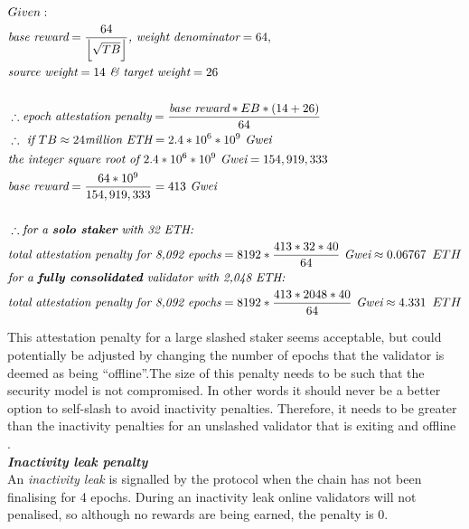 \begin{equation*}
\begin{split}
& Given:\\
& \textit{base reward} = \frac{64}{ \left\lfloor \sqrt{TB} \right\rfloor} \textit{, weight denominator} = 64, \\
& \textit{source weight} = 14 \textit{  \& target weight} = 26\\
& \\
& \therefore \textit{epoch attestation penalty} = \frac{\textit{base reward} * EB * (14 + 26)}{64} \\
& \therefore \textit{ if } TB \approx 24 \textit{million ETH} = 2.4 * 10^6 * 10^9 \textit{ Gwei}\\
& \textit{the integer square root of } 2.4 * 10^6 * 10^9 \textit{ Gwei} = 154,919,333 \\
& \textit{base reward} = \frac{64 * 10^9}{154,919,333} = 413 \textit{ Gwei} \\
& \\
& \therefore \textit{for a \textbf{solo staker} with 32 ETH:} \\
& \textit{total attestation penalty for 8,092 epochs} = 8192 * \frac{413*32*40}{64}  \textit{ Gwei}  \approx 0.06767 \texttt{ } ETH \\
& \textit{for a \textbf{fully consolidated} validator with 2,048 ETH:} \\
& \textit{total attestation penalty for 8,092 epochs} = 8192 * \frac{413*2048*40}{64}  \textit{ Gwei}\approx 4.331 \texttt{ } ETH \\
\end{split}
\end{equation*}

This attestation penalty for a large slashed staker seems acceptable, but could potentially be adjusted by changing the number of epochs that the validator is deemed as being ``offline''.The size of this penalty needs to be such that the security model is not compromised. In other words it should never be a better option to self-slash to avoid inactivity penalties. Therefore, it needs to be greater than the inactivity penalties for an unslashed validator that is exiting and offline \cite{Neuder2023d}. \\

\noindent
\textbf{\textit{Inactivity leak penalty}} \\
An \textit{inactivity leak} is signalled by the protocol when the chain has not been finalising for 4 epochs. During an inactivity leak online validators will not penalised, so although no rewards are being earned, the penalty is 0. 

